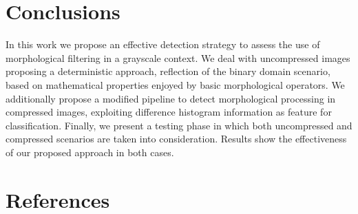 \documentclass[review]{elsarticle}
\begin{document}
\section{Conclusions}
\label{sec:conclusions}
In this work we propose an effective detection strategy to assess the use of morphological filtering in a grayscale context. We deal with uncompressed images proposing a deterministic approach, reflection of the binary domain scenario, based on mathematical properties enjoyed by basic morphological operators. We additionally propose a modified pipeline to detect morphological processing in compressed images, exploiting difference histogram information as feature for  classification. Finally, we present a testing phase in which both uncompressed and compressed scenarios are taken into consideration. Results show the effectiveness of our proposed approach in both cases.  
 

\section*{References}


\newpage
\appendix
\setcounter{table}{0}
\end{document}
